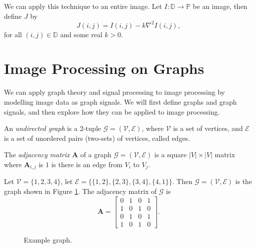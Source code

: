 \documentclass[12pt]{article}
\begin{document}
We can apply this technique to an entire image. Let $I: \mathbb{D} \to \mathbb{P}$ be an image, then define $J$ by \[J(i, j) = I(i, j) - k\nabla^2I(i, j),\] for all $(i, j) \in \mathbb{D}$ and some real $k > 0$.

\section{Image Processing on Graphs}

We can apply graph theory and signal processing to image processing by modelling image data as graph signals. We will first define graphs and graph signals, and then explore how they can be applied to image processing.

\begin{defn}
    An \emph{undirected graph} is a $2$-tuple $\mathcal{G} = (\mathcal{V}, \mathcal{E})$, where $\mathcal{V}$ is a set of vertices, and $\mathcal{E}$ is a set of unordered pairs (two-sets) of vertices, called edges.
\end{defn}

\begin{defn}
    The \emph{adjacency matrix} $\bm{A}$ of a graph $\mathcal{G} = (\mathcal{V}, \mathcal{E})$ is a square $|V| \times |V|$ matrix where $\bm{A}_{i, j}$ is $1$ is there is an edge from $V_i$ to $V_j$.
\end{defn}

\begin{exmp}
    Let $\mathcal{V} = \{1, 2, 3, 4\}$, let $\mathcal{E} = \{\{1, 2\}, \{2, 3\}, \{3, 4\}, \{4, 1\}\}$. Then $\mathcal{G} = (\mathcal{V}, \mathcal{E})$ is the graph shown in Figure \ref{fig:example-graph}. The adjacency matrix of $\mathcal{G}$ is
    \[\bm{A} = \begin{bmatrix}
        0 & 1 & 0 & 1 \\
        1 & 0 & 1 & 0 \\
        0 & 1 & 0 & 1 \\
        1 & 0 & 1 & 0
    \end{bmatrix}.\]
\end{exmp}

\begin{figure}[ht!]
    \centering
\caption{Example graph.}
\label{fig:example-graph}
\end{figure}
\end{document}
